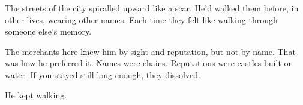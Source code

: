 \documentclass[12pt, a4paper, twoside, openright]{book}
\newcommand{\SceneBreak}{%
  \vspace{14pt}%
  \begin{center}%
    {\color{StoneLight}\small
      \textperiodcentered\quad\textperiodcentered\quad\textperiodcentered}%
  \end{center}%
  \vspace{10pt}}
\newcommand{\BookChapter}[2]{%
  \thispagestyle{fancy}%
  \vspace*{2.0cm}%
  \begin{center}%
    {\color{Stone}\fontsize{7}{9}\selectfont\LabelFont
      \addfontfeatures{LetterSpace=10}\MakeUppercase{Chapter #1}}%
    \vspace{0.4cm}
    {\color{StoneLight}\rule{2.8cm}{0.25pt}}%
    \vspace{0.55cm}
    {\color{Ink}\fontsize{21}{26}\selectfont\itshape #2}%
  \end{center}%
  \vspace{1.0cm}%
}
\begin{document}
The streets of the city spiralled upward like a scar. He'd walked them before, in other lives, wearing other names. Each time they felt like walking through someone else's memory.

\SceneBreak

The merchants here knew him by sight and reputation, but not by name. That was how he preferred it. Names were chains. Reputations were castles built on water. If you stayed still long enough, they dissolved.

He kept walking.

\newpage


\end{document}
